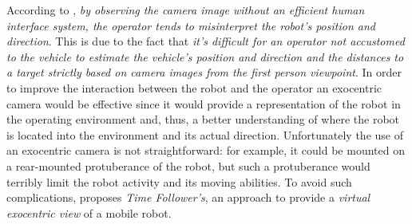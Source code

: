 %
According to \cite{sugimoto}, \textit{by observing the camera image 
without an efficient human interface system, the operator 
tends to misinterpret the robot's position and direction}. This is 
due to the fact that  \textit{it's difficult for an
operator not accustomed to the vehicle to estimate the
vehicle's position and direction and the distances to a
target strictly based on camera images from the first person 
viewpoint}.
%
In order to improve the interaction between the robot and the operator 
an exocentric camera would be effective since it would provide a 
representation of the robot in the operating environment and, thus, 
a better understanding of where the robot is located into the environment 
and its actual direction.
%
Unfortunately the use of an exocentric camera is not straightforward: 
for example, it could be mounted on a rear-mounted protuberance of the 
robot, but such a protuberance would terribly limit the robot activity and 
its moving abilities.
%
To avoid such complications, \cite{sugimoto} proposes 
\textit{Time Follower's}, an approach to provide a \textit{virtual exocentric 
view} of a mobile robot.
%
